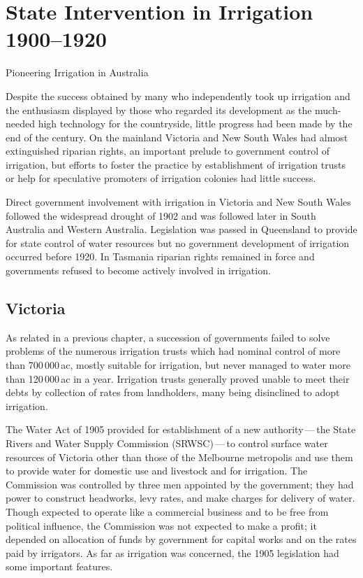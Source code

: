 
\setcounter{endnote}{0}

\chapter{State Intervention in Irrigation 1900--1920}
\label{ch:stateint}
%
{Pioneering Irrigation in Australia}

Despite the success obtained by many who independently took up
irrigation and the enthusiasm displayed by those who regarded its
development as the much-needed high technology for the countryside,
little progress had been made by the end of the century.  On the
mainland Victoria and New South Wales had almost extinguished riparian
rights, an important prelude to government control of irrigation, but
efforts to foster the practice by establishment of irrigation trusts
or help for speculative promoters of irrigation colonies had little
success.

Direct government involvement with irrigation in Victoria and New
South Wales followed the widespread drought of 1902 and was followed
later in South Australia and Western Australia.  Legislation was
passed in Queensland to provide for state control of water resources
but no government development of irrigation occurred before 1920.  In
Tasmania riparian rights remained in force and governments refused to
become actively involved in irrigation.

\section*{Victoria}

As related in a previous chapter, a succession of governments failed
to solve problems of the numerous irrigation trusts which had nominal
control of more than 700\,000\,ac, mostly suitable for irrigation, but
never managed to water more than 120\,000\,ac in a year.  Irrigation
trusts generally proved unable to meet their debts by collection of
rates from landholders, many being disinclined to adopt
irrigation.

The Water Act of 1905 provided for establishment of a new
authority\,---\,the State Rivers and Water Supply Commission (SRWSC)\,---\,to
control surface water resources of Victoria other than those of the
Melbourne metropolis and use them to provide water for domestic use
and livestock and for irrigation.  The Commission was controlled by
three men appointed by the government; they had power to construct
headworks, levy rates, and make charges for delivery of water.  Though
expected to operate like a commercial business and to be free from
political influence, the Commission was not expected to make a profit;
it depended on allocation of funds by government for capital works and
on the rates paid by irrigators.  As far as irrigation was concerned,
the 1905 legislation had some important features.

